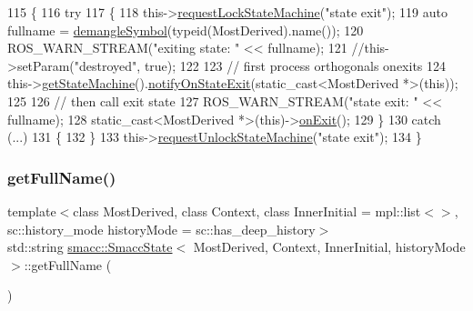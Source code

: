 \begin{DoxyCode}
115     \{
116       \textcolor{keywordflow}{try}
117       \{
118         this->\hyperlink{classsmacc_1_1ISmaccState_ae733140761345e027713bd622d93bf0f}{requestLockStateMachine}(\textcolor{stringliteral}{"state exit"});
119         \textcolor{keyword}{auto} fullname = \hyperlink{namespacesmacc_1_1introspection_a2f495108db3e57604d8d3ff5ef030302}{demangleSymbol}(\textcolor{keyword}{typeid}(MostDerived).name());
120         ROS\_WARN\_STREAM(\textcolor{stringliteral}{"exiting state: "} << fullname);
121         \textcolor{comment}{//this->setParam("destroyed", true);}
122 
123         \textcolor{comment}{// first process orthogonals onexits}
124         this->\hyperlink{classsmacc_1_1SmaccState_afc39f8e0ca4001b2159a100da2fccd0e}{getStateMachine}().\hyperlink{classsmacc_1_1ISmaccStateMachine_a9d2bd4aca0c80a1ec22c5f95e7c38db8}{notifyOnStateExit}(static\_cast<MostDerived
       *>(\textcolor{keyword}{this}));
125 
126         \textcolor{comment}{// then call exit state}
127         ROS\_WARN\_STREAM(\textcolor{stringliteral}{"state exit: "} << fullname);
128         \textcolor{keyword}{static\_cast<}MostDerived *\textcolor{keyword}{>}(\textcolor{keyword}{this})->\hyperlink{classsmacc_1_1SmaccState_a82ca7c69153e86dc5eedf3f909560f3a}{onExit}();
129       \}
130       \textcolor{keywordflow}{catch} (...)
131       \{
132       \}
133       this->\hyperlink{classsmacc_1_1ISmaccState_a3bf006f25d5b9c0534c8e89ae2e93d40}{requestUnlockStateMachine}(\textcolor{stringliteral}{"state exit"});
134     \}
\end{DoxyCode}
\mbox{\label{classsmacc_1_1SmaccState_a897dbdfe52a8b944d4bf1844ddcc3aa5}} 
\subsubsection{\texorpdfstring{get\+Full\+Name()}{getFullName()}}
{\footnotesize\ttfamily template$<$class Most\+Derived, class Context, class Inner\+Initial = mpl\+::list$<$$>$, sc\+::history\+\_\+mode history\+Mode = sc\+::has\+\_\+deep\+\_\+history$>$ \\
std\+::string \hyperlink{classsmacc_1_1SmaccState}{smacc\+::\+Smacc\+State}$<$ Most\+Derived, Context, Inner\+Initial, history\+Mode $>$\+::get\+Full\+Name (\begin{DoxyParamCaption}{ }\end{DoxyParamCaption})\hspace{0.3cm}{\ttfamily [inline]}}



